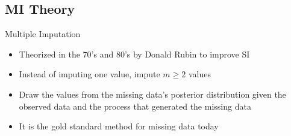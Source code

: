 \subsection{MI Theory}

\begin{frame}{Multiple Imputation}
\begin{itemize}
\item Theorized in the 70's and 80's by Donald Rubin to improve SI
 \item Instead of imputing one value, impute $m\geq 2$ values
 \item Draw the values from the missing data's posterior distribution given the observed
 data and the process that generated the missing data
 \item It is the gold standard method for missing data today
\end{itemize}



\end{frame}


